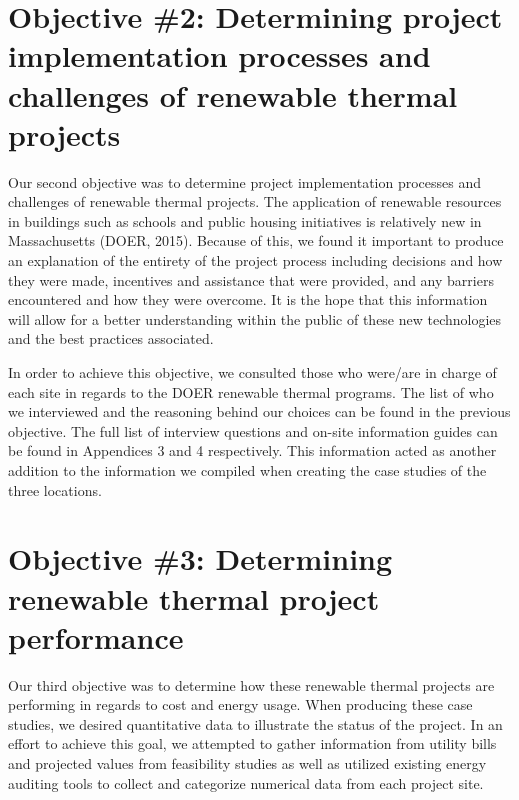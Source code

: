   \section{Objective \#2: Determining project implementation processes and challenges of renewable thermal projects}
  \par Our second objective was to determine project implementation processes and challenges of renewable thermal projects. The application of renewable resources in buildings such as schools and public housing initiatives is relatively new in Massachusetts (DOER, 2015). Because of this, we found it important to produce an explanation of the entirety of the project process including decisions and how they were made, incentives and assistance that were provided, and any barriers encountered and how they were overcome. It is the hope that this information will allow for a better understanding within the public of these new technologies and the best practices associated.
  \par In order to achieve this objective, we consulted those who were/are in charge of each site in regards to the DOER renewable thermal programs. The list of who we interviewed and the reasoning behind our choices can be found in the previous objective. The full list of interview questions and on-site information guides can be found in Appendices 3 and 4 respectively. This information acted as another addition to the information we compiled when creating the case studies of the three locations.

  \section{Objective \#3: Determining renewable thermal project performance }
  \par Our third objective was to determine how these renewable thermal projects are performing in regards to cost and energy usage. When producing these case studies, we desired quantitative data to illustrate the status of the project. In an effort to achieve this goal, we attempted to gather information from utility bills and projected values from feasibility studies as well as utilized existing energy auditing tools to collect and categorize numerical data from each project site.  

